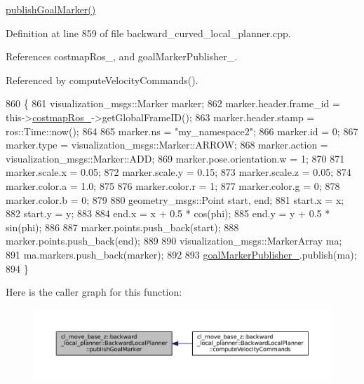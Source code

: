 \hyperlink{classcl__move__base__z_1_1backward__local__planner_1_1BackwardLocalPlanner_a70eaeb6cf31fd3378d9fbf9bcb975995}{publish\+Goal\+Marker()} 

Definition at line 859 of file backward\+\_\+curved\+\_\+local\+\_\+planner.\+cpp.



References costmap\+Ros\+\_\+, and goal\+Marker\+Publisher\+\_\+.



Referenced by compute\+Velocity\+Commands().


\begin{DoxyCode}
860         \{
861             visualization\_msgs::Marker marker;
862             marker.header.frame\_id = this->\hyperlink{classcl__move__base__z_1_1backward__local__planner_1_1BackwardLocalPlanner_a4136268882a105d9e06e173d85d5c0dc}{costmapRos\_}->getGlobalFrameID();
863             marker.header.stamp = ros::Time::now();
864 
865             marker.ns = \textcolor{stringliteral}{"my\_namespace2"};
866             marker.id = 0;
867             marker.type = visualization\_msgs::Marker::ARROW;
868             marker.action = visualization\_msgs::Marker::ADD;
869             marker.pose.orientation.w = 1;
870 
871             marker.scale.x = 0.05;
872             marker.scale.y = 0.15;
873             marker.scale.z = 0.05;
874             marker.color.a = 1.0;
875 
876             marker.color.r = 1;
877             marker.color.g = 0;
878             marker.color.b = 0;
879 
880             geometry\_msgs::Point start, end;
881             start.x = x;
882             start.y = y;
883 
884             end.x = x + 0.5 * cos(phi);
885             end.y = y + 0.5 * sin(phi);
886 
887             marker.points.push\_back(start);
888             marker.points.push\_back(end);
889 
890             visualization\_msgs::MarkerArray ma;
891             ma.markers.push\_back(marker);
892 
893             \hyperlink{classcl__move__base__z_1_1backward__local__planner_1_1BackwardLocalPlanner_a79f0ddfa686e2cd47bbc2f0bac9f3d4c}{goalMarkerPublisher\_}.publish(ma);
894         \}
\end{DoxyCode}
Here is the caller graph for this function\+:
\nopagebreak
\begin{figure}[H]
\begin{center}
\leavevmode
\includegraphics[width=350pt]{classcl__move__base__z_1_1backward__local__planner_1_1BackwardLocalPlanner_a70eaeb6cf31fd3378d9fbf9bcb975995_icgraph}
\end{center}
\end{figure}
